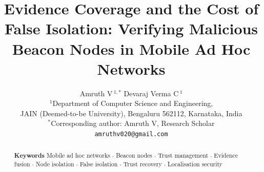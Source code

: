 \documentclass[12pt]{article}
\title{\textbf{Evidence Coverage and the Cost of False Isolation: Verifying
Malicious Beacon Nodes in Mobile Ad Hoc Networks}}
\author{%
  \normalsize Amruth V\,$^{1,\ast}$ \quad Devaraj Verma C\,$^{1}$ \\[8pt]
  \small $^{1}$Department of Computer Science and Engineering, \\
  \small JAIN (Deemed-to-be University), Bengaluru 562112, Karnataka, India \\[6pt]
  \small $^{\ast}$Corresponding author: Amruth V, Research Scholar \\
  \small \texttt{amruthv020@gmail.com}%
}
\date{}
\begin{document}
\maketitle

\begin{abstract}
\noindent 

\medskip
\noindent\textbf{Keywords} Mobile ad hoc networks $\cdot$ Beacon nodes
$\cdot$ Trust management $\cdot$ Evidence fusion $\cdot$ Node isolation
$\cdot$ False isolation $\cdot$ Trust recovery $\cdot$ Localisation security
\end{abstract}











\end{document}
